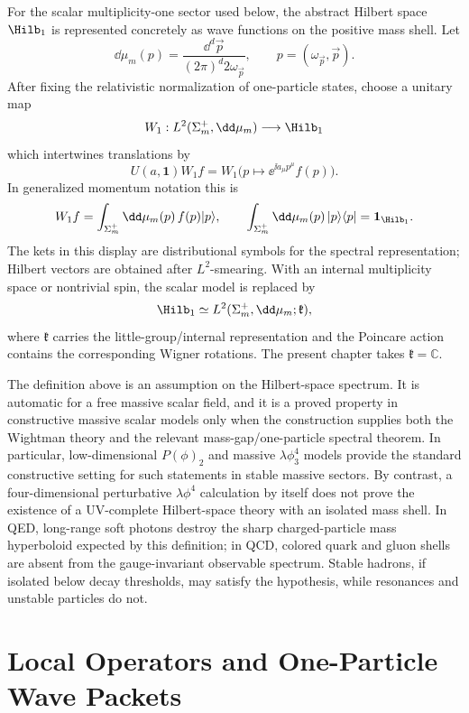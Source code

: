 For the scalar multiplicity-one sector used below, the abstract Hilbert space
\(\Hilb_1\) is represented concretely as wave functions on the positive mass
shell.  Let
\[
  \dd\mu_m(p)
  =
  \frac{\dd^d\vec p}{(2\pi)^d2\omega_{\vec p}},
  \qquad
  p=(\omega_{\vec p},\vec p).
\]
After fixing the relativistic normalization of one-particle states, choose a
unitary map
\[
  W_1:L^2(\Sigma_m^+,\dd\mu_m)\longrightarrow \Hilb_1
\]
which intertwines translations by
\[
  U(a,\mathbf 1)W_1 f
  =
  W_1\bigl(p\mapsto \ee^{\ii a_\mu p^\mu}f(p)\bigr).
\]
In generalized momentum notation this is
\[
  W_1 f
  =
  \int_{\Sigma_m^+}\dd\mu_m(p)\,f(p)|p\rangle,
  \qquad
  \int_{\Sigma_m^+}\dd\mu_m(p)\,|p\rangle\langle p|
  =
  \mathbf 1_{\Hilb_1}.
\]
The kets in this display are distributional symbols for the spectral
representation; Hilbert vectors are obtained after \(L^2\)-smearing.  With an
internal multiplicity space or nontrivial spin, the scalar model is replaced by
\[
  \Hilb_1\simeq L^2(\Sigma_m^+,\dd\mu_m;\mathfrak k),
\]
where \(\mathfrak k\) carries the little-group/internal representation and the
Poincare action contains the corresponding Wigner rotations.  The present
chapter takes \(\mathfrak k=\mathbb C\).

\begin{remark}
\label{rem:haag-ruelle-isolated-shell-existence-scope}
The definition above is an assumption on the Hilbert-space spectrum.  It is
automatic for a free massive scalar field, and it is a proved property in
constructive massive scalar models only when the construction supplies both the
Wightman theory and the relevant mass-gap/one-particle spectral theorem.  In
particular, low-dimensional \(P(\phi)_2\) and massive \(\lambda\phi^4_3\)
models provide the standard constructive setting for such statements in stable
massive sectors.  By contrast, a four-dimensional perturbative
\(\lambda\phi^4\) calculation by itself does not prove the existence of a
UV-complete Hilbert-space theory with an isolated mass shell.  In QED,
long-range soft photons destroy the sharp charged-particle mass hyperboloid
expected by this definition; in QCD, colored quark and gluon shells are absent
from the gauge-invariant observable spectrum.  Stable hadrons, if isolated
below decay thresholds, may satisfy the hypothesis, while resonances and
unstable particles do not.
\end{remark}

\section{Local Operators and One-Particle Wave Packets}

